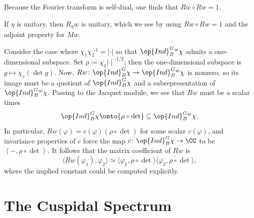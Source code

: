 \documentclass{article}
\begin{document}
\begin{remark}
	Because the Fourier transform is self-dual, one finds that $Rw\circ Rw=1$.
\end{remark}
\begin{remark}
	If $\eta$ is unitary, then $R_\eta w$ is unitary, which we see by using $Rw\circ Rw=1$ and the adjoint property for $Mw$.
\end{remark}
\begin{remark}
	Consider the case where $\chi_1\chi_2^{-1}=\left|\cdot\right|$ so that $\op{Ind}_B^G{^w\chi}$ admits a one-dimensional subspace. Set $\rho\coloneqq\chi_1\left|\cdot\right|^{-1/2}$; then the one-dimensional subspace is $g\mapsto\chi_v(\det g)$. Now, $Rw\colon\op{Ind}_B^G\chi\to\op{Ind}_B^G{^w\chi}$ is nonzero, so its image must be a quotient of $\op{Ind}_B^G\chi$ and a subrepresentation of $\op{Ind}_B^G{^w\chi}$. Passing to the Jacquet module, we see that $Rw$ must be a scalar times
	\[\op{Ind}_B^G\chi\onto{\rho\circ\det}\subseteq\op{Ind}_B^G{^w\chi}.\]
	In particular, $Rw(\varphi)=c(\varphi)({\rho\circ\det})$ for some scalar $c(\varphi)$, and invariance properties of $c$ force the map $c\colon\op{Ind}_B^G\chi\to\CC$ to be $\left\langle-,\rho\circ\det\right\rangle$. It follows that the matrix coefficient of $Rw$ is
	\[\langle Rw(\varphi_1),\varphi_2\rangle\simeq\langle\varphi_1,{\rho\circ\det}\rangle\overline{\langle\varphi_2,{\rho\circ\det}\rangle},\]
	where the implied constant could be computed explicitly.
\end{remark}

\section{The Cuspidal Spectrum}
\end{document}
